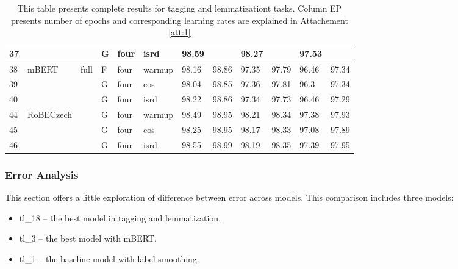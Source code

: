 \begin{table}[!h]
{\begin{tabular}{|l|l|l|l|l|l||llllll|}
37 &                              &                         & G	& four                     & isrd   & 98.59  &         & 98.27   &          & 97.53     &            \\ \hline
38 & \multirow{3}{*}{mBERT}       & \multirow{9}{*}{full}   & F	& four                     & warmup & 98.16  & 98.86   & 97.35   & 97.79    & 96.46     & 97.34      \\ \cline{1-1} \cline{4-12}
39 &                              &                         & G	& four                     & cos    & 98.04  & 98.85   & 97.36   & 97.81    & 96.3      & 97.34      \\ \cline{1-1} \cline{4-12}
40 &                              &                         & G	& four                     & isrd   & 98.22  & 98.86   & 97.34   & 97.73    & 96.46     & 97.29      \\ \cline{1-2} \cline{4-12}
44 & \multirow{3}{*}{RoBECzech}   &                         & G	& four                     & warmup & 98.49  & 98.95   & 98.21   & 98.34    & 97.38     & 97.93      \\ \cline{1-1} \cline{4-12}
45 &                              &                         & G	& four                     & cos    & 98.25  & 98.95   & 98.17   & 98.33    & 97.08     & 97.89      \\ \cline{1-1} \cline{4-12}
46 &                              &                         & G	& four                     & isrd   & 98.55  & 98.99   & 98.19   & 98.35    & 97.39     & 97.95      \\ \hline

\end{tabular}
}
\caption{This table presents complete results for tagging and lemmatizationt tasks. Column EP presents number of epochs and corresponding learning rates are explained in Attachement \protect\ref{att:1} }
\label{tab:all_res_tl}
\end{table}

\subsubsection{Error Analysis}
This section offers a little exploration of difference between error across models. This comparison includes three models: 
\begin{itemize}
\item tl\_18 -- the best model in tagging and lemmatization,
\item tl\_3 -- the best model with mBERT,
\item tl\_1 -- the baseline model with label smoothing.
\end{itemize} 

